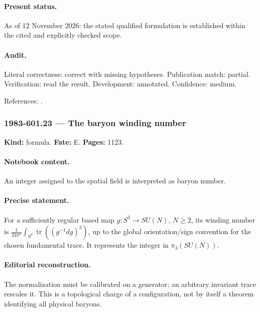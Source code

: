 \paragraph{Present status.} As of 12 November 2026: the stated qualified formulation is established within the cited and explicitly checked scope.

\paragraph{Audit.} Literal correctness: correct with missing hypotheses. Publication match: partial. Verification: read the result. Development: annotated. Confidence: medium.

\noindent References: \citep{zuminowuzee1984anomalies}.\par

\subsubsection{1983-601.23 --- The baryon winding number}

\label{item:1983-601.23}

\noindent\textbf{Kind:} formula. \textbf{Fate:} E. \textbf{Pages:} 1123.\par

\paragraph{Notebook content.} An integer assigned to the spatial field is interpreted as baryon number.

\paragraph{Precise statement.} For a sufficiently regular based map \(g:S^3\to SU(N)\), \(N\ge2\), its winding number is \(\frac1{24\pi^2}\int_{S^3}\operatorname{tr}((g^{-1}dg)^3)\), up to the global orientation/sign convention for the chosen fundamental trace. It represents the integer in \(\pi_3(SU(N))\).

\paragraph{Editorial reconstruction.} The normalization must be calibrated on a generator; an arbitrary invariant trace rescales it. This is a topological charge of a configuration, not by itself a theorem identifying all physical baryons.

